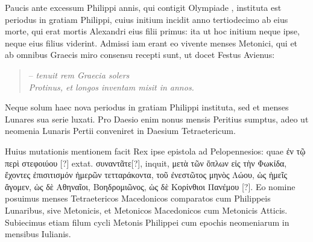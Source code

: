 Paucis ante excessum Philippi annis, qui contigit Olympiade
, instituta est periodus in gratiam Philippi, cuius initium incidit
anno tertiodecimo ab eius morte, qui erat mortis Alexandri
eius filii primus: ita ut hoc initium neque ipse, neque eius filius viderint.
Admissi iam erant eo vivente menses Metonici, qui et ab omnibus
Graecis miro consensu recepti sunt, ut docet Festus Avienus:
\begin{quote}
-- \emph{tenuit rem Graecia solers}\\
\emph{Protinus, et longos inventam misit in annos.}
\end{quote}
Neque solum haec nova periodus in gratiam Philippi instituta, sed et
menses Lunares sua serie luxati.
Pro Daesio enim nonus mensis Peritius
sumptus, adeo ut neomenia Lunaris Pertii conveniret in Daesium
Tetraetericum.

Huius mutationis mentionem
facit Rex ipse epistola ad Pelopennesios:
quae \textgreek{ἐν τῷ περὶ στεφοιύου [?]} extat.
\textgreek{συναντᾶτε[?]},
inquit, \textgreek{μετὰ τῶν ὅπλων εἰς τὴν Φωκίδα,
 ἔχοντες ἐπισιτισμόν ἡμερῶν τετταράκοντα,
τοῦ ἐνεστῶτος μηνὸς Λώου, ὡς ἡμεῖς ἄγομεν, ὡς δὲ Αθηναῖοι, Βοηδρομιῶνος,
ὡς δὲ Κορίνθιοι Πανέμου [?]}.
Eo nomine posuimus menses Tetraetericos
Macedonicos comparatos cum Philippeis Lunaribus, sive
Metonicis, et Metonicos Macedonicos cum Metonicis Atticis.
Subiecimus etiam filum cycli Metonis Philippei cum epochis neomeniarum
in mensibus Iulianis.

